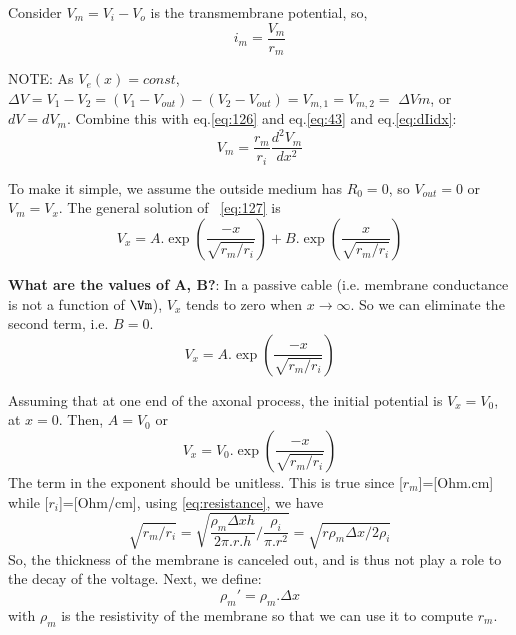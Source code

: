 Consider $V_m = V_i - V_o$ is the transmembrane potential, so,
\begin{equation}
  \label{eq:126}
  i_m =  \frac{V_m}{r_m}
\end{equation}


NOTE: As $V_e(x)= const$, 
$\Delta V = V_1-V_2 = (V_1 - V_{out}) - (V_2 -V_{out}) = V_{m,1} = V_{m,2} =$
$\Delta Vm$, or $d V = d V_m$.
Combine this with eq.\ref{eq:126} and eq.\ref{eq:43} and eq.\ref{eq:dIidx}:
\begin{equation}
  \label{eq:127}
  V_m = \frac{r_m}{r_i} \frac{d ^2V_m}{d x^2}
\end{equation}

\begin{mdframed}[linecolor=red!60!black,  linewidth=2pt]

To make it simple, we assume the outside medium has $R_{0} =
0$, so $V_{out}= 0$ or $V_m = V_x$. 
The general solution of ~\eqref{eq:127} is
\begin{equation}
  V_x = A.\exp \left( \frac{-x}{\sqrt{r_m/r_i}} \right) +  B.\exp
  \left( \frac{x}{\sqrt{r_m/r_i}} \right)
\end{equation}


{\bf What are the values of A, B?}: In a passive cable (i.e. membrane
conductance is not a function of $\Vm$), $V_x$ tends to zero when
$x\rightarrow \infty$. So we can eliminate the second term, i.e. $B=0$.
\begin{equation}
   V_x = A.\exp \left( \frac{-x}{\sqrt{r_m/r_i}} \right) 
\end{equation}

\end{mdframed}

Assuming that at one end of the axonal process, the initial potential
is $V_x = V_0$, at $x=0$. Then, $A = V_0$ or
\begin{equation}
  \label{eq:128}   
 V_x = V_0.\exp \left( \frac{-x}{\sqrt{r_m/r_i}} \right) 
\end{equation}
The term in the exponent should be unitless. This is true since
[$r_m$]=[Ohm.cm] while [$r_i$]=[Ohm/cm], using \eqref{eq:resistance},
we have
\begin{equation}
  \sqrt{r_m/r_i} = \sqrt{\frac{\rho_m\Delta
      x h}{2\pi.r.h}/\frac{\rho_i}{\pi.r^2}} = \sqrt{r\rho_m\Delta x/2\rho_i}
\end{equation}
So, the thickness of the membrane is canceled out, and is thus not play a role
to the decay of the voltage. Next, we define:
\begin{equation}\label{eq:rhom}
  \rho_m' = \rho_m. \Delta x
\end{equation}
with $\rho_m$ is the resistivity of the membrane so that we can use it
to compute $r_m$.



